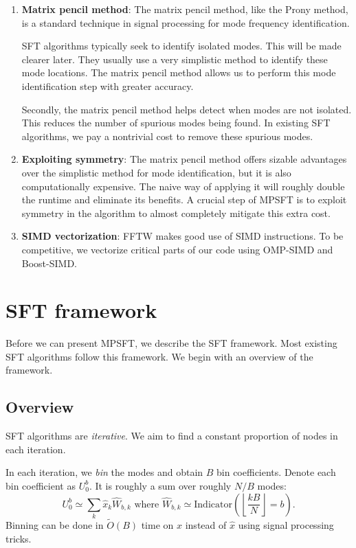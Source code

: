 \documentclass[10pt]{article}
\begin{document}
\begin{enumerate}
\item \textbf{Matrix pencil method}: The matrix pencil method, like the Prony method, is a standard technique in signal processing for mode frequency identification.

SFT algorithms typically seek to identify isolated modes. This will be made clearer later. They usually use a very simplistic method to identify these mode locations. The matrix pencil method allows us to perform this mode identification step with greater accuracy.

Secondly, the matrix pencil method helps detect when modes are not isolated. This reduces the number of spurious modes being found. In existing SFT algorithms, we pay a nontrivial cost to remove these spurious modes.

\item \textbf{Exploiting symmetry}: The matrix pencil method offers sizable advantages over the simplistic method for mode identification, but it is also computationally expensive. The naive way of applying it will roughly double the runtime and eliminate its benefits. A crucial step of MPSFT is to exploit symmetry in the algorithm to almost completely mitigate this extra cost.

\item \textbf{SIMD vectorization}: FFTW makes good use of SIMD instructions. To be competitive, we vectorize critical parts of our code using OMP-SIMD and Boost-SIMD.

\end{enumerate}

\section{SFT framework}

Before we can present MPSFT, we describe the SFT framework. Most existing SFT algorithms follow this framework. We begin with an overview of the framework.

\subsection{Overview}\label{sec:overview}

SFT algorithms are \emph{iterative}. We aim to find a constant proportion of nodes in each iteration.

In each iteration, we \emph{bin} the modes and obtain $B$ bin coefficients. Denote each bin coefficient as $U^b_0$. It is roughly a sum over roughly $N/B$ modes:
$$U^b_0 \simeq \sum_k \hat{x}_k \hat{W}_{b,k} \text{ where } \hat{W}_{b,k} \simeq \text{Indicator}\left(\left\lfloor \frac{kB}{N} \right\rfloor = b\right).$$
Binning can be done in $\tilde{O}(B)$ time on $x$ instead of $\hat{x}$ using signal processing tricks.
\end{document}
